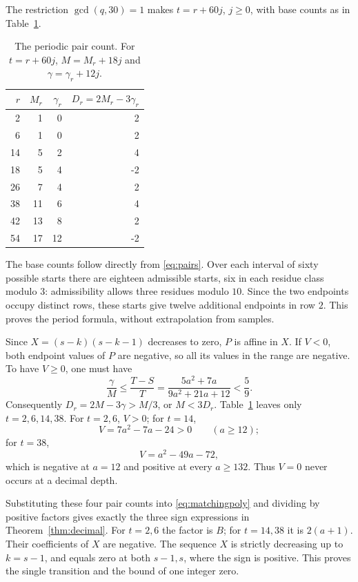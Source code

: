 \documentclass[11pt,a4paper]{article}
\theoremstyle{remark}
\numberwithin{equation}{section}
\begin{document}
The restriction \(\gcd(q,30)=1\) makes \(t=r+60j\), \(j\ge0\),
with base counts as in Table~\ref{tab:matching}.

\begin{table}[htbp]
\centering
\begin{tabular}{@{}rrrr@{}}
\toprule
\(r\)&\(M_r\)&\(\gamma_r\)&\(D_r=2M_r-3\gamma_r\)\\
\midrule
2&1&0&2\\
6&1&0&2\\
14&5&2&4\\
18&5&4&-2\\
26&7&4&2\\
38&11&6&4\\
42&13&8&2\\
54&17&12&-2\\
\bottomrule
\end{tabular}
\caption{The periodic pair count. For \(t=r+60j\),
\(M=M_r+18j\) and \(\gamma=\gamma_r+12j\).}\label{tab:matching}
\end{table}

The base counts follow directly from \eqref{eq:pairs}.
Over each interval of sixty possible starts there are eighteen
admissible starts, six in each residue class modulo \(3\):
admissibility allows three residues modulo \(10\).
Since the two endpoints occupy distinct rows, these starts give
twelve additional endpoints in row \(2\).
This proves the period formula, without extrapolation from samples.

Since \(X=(s-k)(s-k-1)\) decreases to zero, \(P\) is affine in \(X\).
If \(V<0\), both endpoint values of \(P\) are negative, so all its
values in the range are negative. To have \(V\ge0\), one must have
\begin{equation}\label{eq:ratio}
 \frac{\gamma}{M}\le\frac{T-S}{T}
 =\frac{5a^2+7a}{9a^2+21a+12}<\frac59.
\end{equation}
Consequently \(D_r=2M-3\gamma>M/3\), or \(M<3D_r\).
Table~\ref{tab:matching} leaves only \(t=2,6,14,38\).
For \(t=2,6\), \(V>0\); for \(t=14\),
\[
 V=7a^2-7a-24>0\qquad(a\ge12);
\]
for \(t=38\),
\[
 V=a^2-49a-72,
\]
which is negative at \(a=12\) and positive at every \(a\ge132\).
Thus \(V=0\) never occurs at a decimal depth.

Substituting these four pair counts into \eqref{eq:matchingpoly}
and dividing by positive factors gives exactly the three sign
expressions in Theorem~\ref{thm:decimal}. For \(t=2,6\) the factor is
\(B\); for \(t=14,38\) it is \(2(a+1)\).
Their coefficients of \(X\) are negative.
The sequence \(X\) is strictly decreasing up to \(k=s-1\),
and equals zero at both \(s-1,s\), where the sign is positive.
This proves the single transition and the bound of one integer zero.
\end{document}
